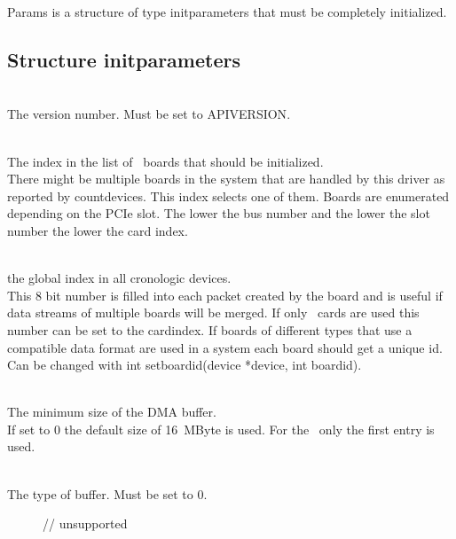 		Params is a structure of type \textsf{\prefix init\tu parameters} that must be completely initialized.\par

		\subsection{Structure \prefix init\tu parameters}
			\\
			The version number. Must be set to \textsf{\PREFIX API\tu VERSION}.\par

			\\
			The index in the list of \deviceName\ boards that should be initialized.\\
			There might be multiple boards in the system that are handled by this driver as reported by \textsf{\prefix count\tu devices}. This index selects one of them. Boards are enumerated depending on the PCIe slot. 
			The lower the bus number and the lower the slot number the lower the card index.\par

			\\
			the global index in all cronologic devices.\\
			This 8 bit number is filled into each packet created by the board and is useful if data streams of multiple boards will be merged. If only \deviceName\ cards are used this number can be set to the \textsf{card\tu index}. 
			If boards of different types that use a compatible data format are used in a system each board should get a unique id.
			Can be changed with \textsf{int \prefix set\tu board\tu id\allowbreak(\prefix device *device, int board\tu id)}.\par

			\\
			The minimum size of the DMA buffer.\\
			If set to 0 the default size of 16~MByte is used. For the \deviceName\ only the first entry is used.\par

			\\
			The type of buffer. Must be set to 0.
			\begin{description}
				\item[]  
				\item[]    // unsupported
			\end{description}

